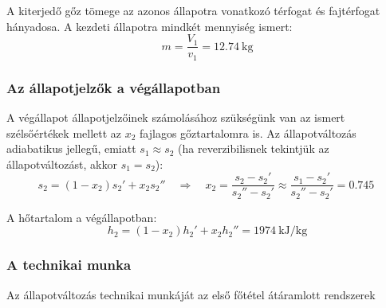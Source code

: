 \noindent A kiterjedő gőz tömege az azonos állapotra vonatkozó térfogat és fajtérfogat hányadosa. A kezdeti állapotra mindkét mennyiség ismert:
\begin{equation}
	m = \dfrac{V_1}{v_1} = \SI{12,74}{\kilogram}
\end{equation}

\subsubsection{Az állapotjelzők a végállapotban}
A végállapot állapotjelzőinek számolásához szükségünk van az ismert szélsőértékek mellett az $x_2$ fajlagos gőztartalomra is. Az állapotváltozás adiabatikus jellegű, emiatt $s_1 \approx s_2$ (ha reverzibilisnek tekintjük az állapotváltozást, akkor $s_1 = s_2$):
\begin{equation}
	s_2 = \left(1 - x_2\right) s_2' + x_2 s_2''
	\quad 
	\Rightarrow
	\quad 
	x_2
	= 
	\dfrac{s_2 - s_2'}{s_2'' - s_2'} 
	\approx 
	\dfrac{s_1 - s_2'}{s_2'' - s_2'} 
	= 
	\SI{0,745}{}
\end{equation}

\noindent A hőtartalom a végállapotban:
\begin{equation}
	h_2 = \left(1 - x_2\right) h_2' + x_2 h_2'' 
	= 
	\SI{1974}{\kilo\joule\per\kilogram}
\end{equation}

\subsubsection{A technikai munka}
Az állapotváltozás technikai munkáját az első főtétel átáramlott rendszerek

